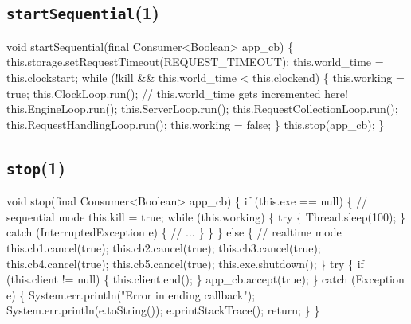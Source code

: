 \subsection{\texttt{startSequential}(1)}
\nwenddocs{}\endmoddef{}
void startSequential(final Consumer<Boolean> app_cb) \{
  this.storage.setRequestTimeout(REQUEST_TIMEOUT);
  this.world_time = this.clockstart;
  while (!kill && this.world_time < this.clockend) \{
    this.working = true;
    this.ClockLoop.run();  // this.world_time gets incremented here!
    this.EngineLoop.run();
    this.ServerLoop.run();
    this.RequestCollectionLoop.run();
    this.RequestHandlingLoop.run();
    this.working = false;
  \}
  this.stop(app_cb);
\}
\eatline
{}\nwendcode{}\nwdocspar
\subsection{\texttt{stop}(1)}
\nwenddocs{}\endmoddef{}
void stop(final Consumer<Boolean> app_cb) \{
  if (this.exe == null) \{  // sequential mode
    this.kill = true;
    while (this.working) \{
      try \{
        Thread.sleep(100);
      \} catch (InterruptedException e) \{
        // ...
      \}
    \}
  \} else \{  // realtime mode
    this.cb1.cancel(true);
    this.cb2.cancel(true);
    this.cb3.cancel(true);
    this.cb4.cancel(true);
    this.cb5.cancel(true);
    this.exe.shutdown();
  \}
  try \{
    if (this.client != null) \{
      this.client.end();
    \}
    app_cb.accept(true);
  \} catch (Exception e) \{
    System.err.println("Error in ending callback");
    System.err.println(e.toString());
    e.printStackTrace();
    return;
  \}
\}
\nwendcode{}\nwdocspar

